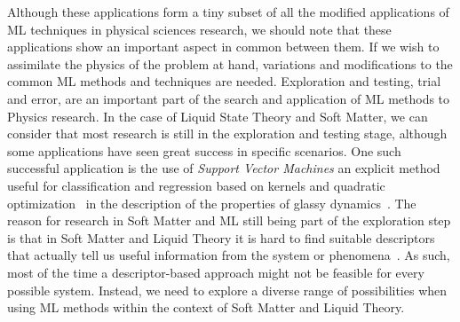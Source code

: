 Although these applications form a tiny subset of all the modified applications of ML 
techniques in physical sciences research, we should note that these applications show an 
important aspect in common between them. If we wish to assimilate the physics of the 
problem at hand, variations and modifications to the common ML methods and techniques are 
needed. Exploration and testing, trial and error, are an important part of the search and 
application of ML methods to Physics research. In the case of Liquid State Theory and Soft 
Matter, we can consider that most research is still in the exploration and testing stage,
although some applications have seen great success in specific scenarios.
One such successful application is the use of \emph{Support Vector Machines}\textemdash
an explicit method useful for classification and regression based on kernels and
quadratic optimization~\cite{steinwartSupportVectorMachines2008}\textemdash
in the description of the properties of glassy dynamics~\cite{schoenholzStructuralApproachRelaxation2016}.
The reason for research in Soft Matter and ML still being part of the exploration step is 
that in Soft Matter and Liquid Theory it is hard to find suitable descriptors that 
actually tell us useful information from the system or phenomena~\cite{dijkstraPredictiveModellingMachine2021a}.
As such, most of the time a descriptor-based approach might not be feasible for every 
possible system. Instead, we need to explore a diverse range of possibilities when using ML 
methods within the context of Soft Matter and Liquid Theory.


